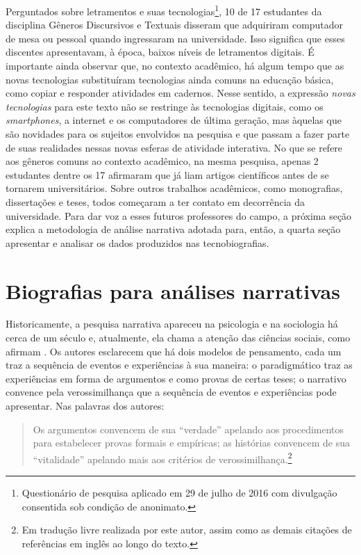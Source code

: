 \documentclass{textolivre}
\begin{document}
Perguntados sobre letramentos e suas tecnologias\footnote{Questionário de pesquisa aplicado em 29 de julho de 2016 com divulgação consentida sob condição de anonimato.}, 10 de 17 estudantes da disciplina Gêneros Discursivos e Textuais disseram que adquiriram computador de mesa ou pessoal quando ingressaram na universidade. Isso significa que esses discentes apresentavam, à época, baixos níveis de letramentos digitais. É importante ainda observar que, no contexto acadêmico, há algum tempo que as novas tecnologias substituíram tecnologias ainda comuns na educação básica, como copiar e responder atividades em cadernos. Nesse sentido, a expressão \textit{novas tecnologias} para este texto não se restringe às tecnologias digitais, como os \textit{smartphones}, a internet e os computadores de última geração, mas àquelas que são novidades para os sujeitos envolvidos na pesquisa e que passam a fazer parte de suas realidades nessas novas esferas de atividade interativa. No que se refere aos gêneros comuns ao contexto acadêmico, na mesma pesquisa, apenas 2 estudantes dentre os 17 afirmaram que já liam artigos científicos antes de se tornarem universitários. Sobre outros trabalhos acadêmicos, como monografias, dissertações e teses, todos começaram a ter contato em decorrência da universidade. Para dar voz a esses futuros professores do campo, a próxima seção explica a metodologia de análise narrativa adotada para, então, a quarta seção apresentar e analisar os dados produzidos nas tecnobiografias.

\section{Biografias para análises narrativas}\label{sec-biografias}
Historicamente, a pesquisa narrativa apareceu na psicologia e na sociologia há cerca de um século e, atualmente, ela chama a atenção das ciências sociais, como afirmam \textcite{barkhuizen_narrative_2014}. Os autores esclarecem que há dois modelos de pensamento, cada um traz a sequência de eventos e experiências à sua maneira: o paradigmático traz as experiências em forma de argumentos e como provas de certas teses; o narrativo convence pela verossimilhança que a sequência de eventos e experiências pode apresentar. Nas palavras dos autores:

\begin{quote}
    Os argumentos convencem de sua “verdade” apelando aos procedimentos para estabelecer provas formais e empíricas; as histórias convencem de sua “vitalidade” apelando mais aos critérios de verossimilhança.\footnote{Em tradução livre realizada por este autor, assim como as demais citações de referências em inglês ao longo do texto.} \cite[p. 1]{barkhuizen_narrative_2014}
\end{quote}
\end{document}
